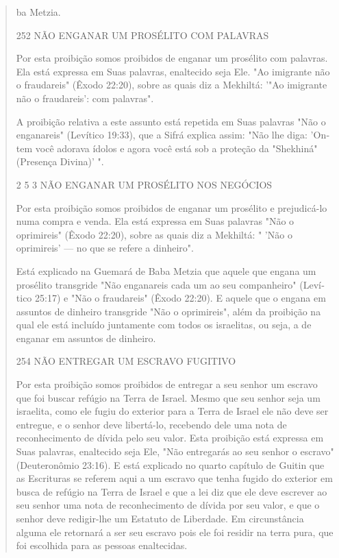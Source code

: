 \begin{quote}
ba Metzia.

252 NÃO ENGANAR UM PROSÉLITO COM PALAVRAS

Por esta proibição somos proibidos de enganar um prosélito com palavras.
Ela está expressa em Suas palavras, enaltecido seja Ele. "Ao imigrante
não o fraudareis" (Êxodo 22:20), sobre as quais diz a Mekhiltá: '"Ao
imigrante não o fraudareis': com palavras".

A proibição relativa a este assunto está repetida em Suas palavras "Não
o enganareis" (Levítico 19:33), que a Sifrá explica assim: "Não lhe
diga: 'On­tem você adorava ídolos e agora você está sob a proteção da
"Shekhiná" (Pre­sença Divina)' ".

2 5 3 NÃO ENGANAR UM PROSÉLITO NOS NEGÓCIOS

Por esta proibição somos proibidos de enganar um prosélito e
prejudicá-lo numa compra e venda. Ela está expressa em Suas palavras
"Não o oprimireis" (Êxodo 22:20), sobre as quais diz a Mekhiltá: 
" 'Não o
oprimireis' --- no que se refere a dinheiro".

Está explicado na Guemará de Baba Metzia que aquele que engana um
prosélito transgride "Não enganareis cada um ao seu companheiro"
(Leví­tico 25:17) e "Não o fraudareis" (Êxodo 22:20). E aquele que o
engana em as­suntos de dinheiro transgride "Não o oprimireis", além da
proibição na qual ele está incluído juntamente com todos os israelitas,
ou seja, a de enganar em assuntos de dinheiro.

254 NÃO ENTREGAR UM ESCRAVO FUGITIVO

Por esta proibição somos proibidos de entregar a seu senhor um es­cravo
que foi buscar refúgio na Terra de Israel. Mesmo que seu senhor seja um
israelita, como ele fugiu do exterior para a Terra de Israel ele não
deve ser en­tregue, e o senhor deve libertá-lo, recebendo dele uma nota
de reconhecimen­to de dívida pelo seu valor. Esta proibição está
expressa em Suas palavras, enal­tecido seja Ele, "Não entregarás ao seu
senhor o escravo" (Deuteronômio 23:16). E está explicado no quarto
capítulo de Guitin que as Escrituras se referem aqui a um escravo que
tenha fugido do exterior em busca de refúgio na Terra de Israel e que a
lei diz que ele deve escrever ao seu senhor uma nota de reconhe­cimento
de dívida por seu valor, e que o senhor deve redigir-lhe um Estatuto de
Liberdade. Em circunstância alguma ele retornará a ser seu escravo pois
ele foi residir na terra pura, que foi escolhida para as pessoas
enaltecidas.


\end{quote}
